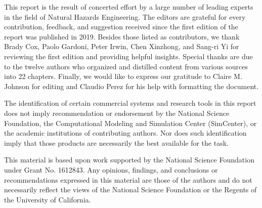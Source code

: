 %
%


This report is the result of concerted effort by a large number of leading experts in the field of Natural Hazards Engineering. The editors are grateful for every contribution, feedback, and suggestion received since the first edition of the report was published in 2019. Besides those listed as contributors, we thank Brady Cox, Paolo Gardoni, Peter Irwin, Chen Xinzhong, and Sang-ri Yi for reviewing the first edition and providing helpful insights. Special thanks are due to the twelve authors who organized and distilled content from various sources into 22 chapters. Finally, we would like to express our gratitude to Claire M. Johnson for editing and Claudio Perez for his help with formatting the document.


The identification of certain commercial systems and research tools in this report does not imply recommendation or endorsement by the National Science Foundation, the Computational Modeling and Simulation Center (SimCenter), or the academic institutions of contributing authors. Nor does such identification imply that those products are necessarily the best available for the task. 


This material is based upon work supported by the National Science Foundation under Grant No. 1612843. Any opinions, findings, and conclusions or recommendations expressed in this material are those of the authors and do not necessarily reflect the views of the National Science Foundation or the Regents of the University of California.

